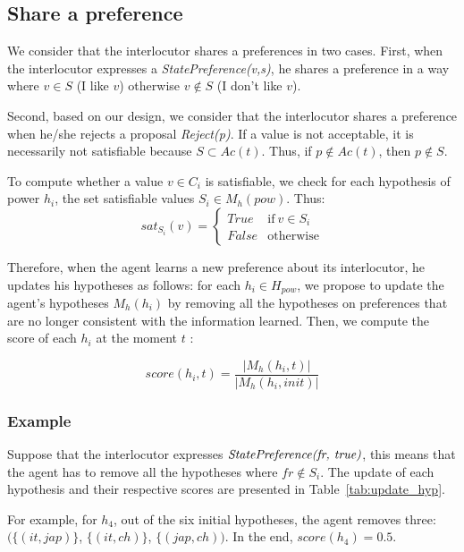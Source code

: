 \documentclass[conference, letterpaper]{IEEEtran}
\begin{document}
	\subsection{Share a preference}
		We consider that the interlocutor shares a preferences in two cases.
		First, when the interlocutor expresses a \emph{StatePreference(v,s)}, he shares a preference in a way where $v \in S$ (I like $v$) otherwise $v \notin S$ (I don't like $v$). 
		
		Second, based on our design, we consider that the interlocutor shares a preference when he/she rejects a proposal \emph{Reject(p)}. If a value is not acceptable, it is necessarily not satisfiable because $S \subset Ac(t)$. Thus, if $p\not\in Ac(t)$, then $p\not\in S$. 
		
		To compute whether a value $v \in C_i$ is satisfiable, we check for each hypothesis of power $h_i$, the set satisfiable values $S_i \in M_h(pow)$.
		Thus: 
			\begin{equation}
			sat_{S_i}(v)= \left\{\begin{array}{ll}
			True	 & \mathrm{if\ }  v \in S_i\\
			False & \mathrm{otherwise}
			\end{array}\right.
			\end{equation}
			
		Therefore, when the agent learns a new preference about its interlocutor, he updates his hypotheses as follows: 
		for each  $h_i \in H_{pow}$, we propose to update the agent's hypotheses $M_h(h_i)$ by removing all the hypotheses on preferences that are no longer consistent with the information learned. 
		Then, we compute the score of each $h_i$ at the moment $t$ :
		
		$$score(h_i,t) = \frac{|M_h(h_i, t)|}{|M_h(h_i, init)|}$$
		
		\subsubsection*{\bf Example}
		
		Suppose that the interlocutor expresses $\emph{StatePreference(fr, true)}$, this means that the agent has to remove all the hypotheses where $fr \not\in S_i$. The update of each hypothesis and their respective scores are presented in Table~\ref{tab:update_hyp}. 
		
		For example, for $h_4$, out of the six initial hypotheses, the agent removes three: $(\{(it,jap)\}$, $\{(it,ch)\}$, $\{(jap,ch))$. In the end, $score(h_4) = 0.5$. 
	
\end{document}
